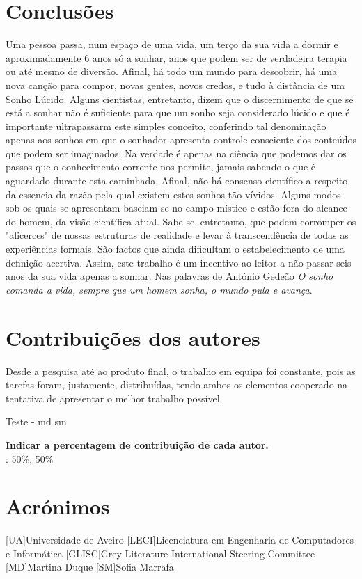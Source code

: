 \documentclass{report}
\begin{document}
\chapter{Conclusões}
\label{chap.conclusao}
Uma pessoa passa, num espaço de uma vida, um terço da sua vida a dormir e aproximadamente 6 anos só a sonhar, anos que podem ser de verdadeira terapia ou até mesmo de diversão. Afinal, há todo um mundo para descobrir, há uma nova canção para compor, novas gentes, novos credos, e tudo à distância de um Sonho Lúcido.
Alguns cientistas, entretanto, dizem que o discernimento de que se está a sonhar não é suficiente para que um sonho seja considerado lúcido e que é importante ultrapassarm este simples conceito, conferindo tal denominação apenas aos sonhos em que o sonhador apresenta controle consciente dos conteúdos que podem ser imaginados.
Na verdade é apenas na ciência que podemos dar os passos que o conhecimento corrente nos permite, jamais sabendo o que é aguardado durante esta caminhada. Afinal, não há consenso científico a respeito da essencia da razão pela qual existem  estes sonhos tão vívidos. Alguns modos sob os quais se apresentam baseiam-se no campo místico e estão fora do alcance do homem, da visão científica atual. Sabe-se, entretanto, que podem corromper os "alicerces" de nossas estruturas de realidade e levar à transcendência de todas as experiências formais. São factos que ainda dificultam o estabelecimento de uma definição acertiva.
Assim, este trabalho é um incentivo ao leitor a não passar seis anos da sua vida apenas a sonhar. 
Nas palavras de António Gedeão \emph{O sonho comanda a vida, sempre que um homem sonha, o mundo pula e avança}.




\chapter*{Contribuições dos autores}
Desde a pesquisa até ao produto final, o trabalho em equipa foi constante, pois as tarefas foram, justamente, distribuídas, tendo ambos os elementos cooperado na tentativa de apresentar o melhor trabalho possível.

Teste - \ac{md}  \ac{sm} 

\vspace{10pt}
\textbf{Indicar a percentagem de contribuição de cada autor.}\\

\autores : 50\%, 50\%\\

\chapter*{Acrónimos}
\begin{acronym}
[UA]{Universidade de Aveiro}
[LECI]{Licenciatura em Engenharia de Computadores e Informática}
[GLISC]{Grey Literature International Steering Committee}
[MD]{Martina Duque}
[SM]{Sofia Marrafa}

 
\end{acronym}


\nocite{*}
\printbibliography
\end{document}

